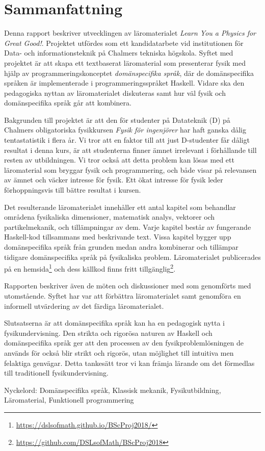 
\thispagestyle{plain}			%

\section*{Sammanfattning}

Denna rapport beskriver utvecklingen av läromaterialet \textit{Learn You a
Physics for Great Good!}. Projektet utfördes som ett kandidatarbete vid institutionen
för Data- och informationsteknik på Chalmers tekniska högskola. Syftet
med projektet är att skapa ett textbaserat läromaterial som presenterar fysik med hjälp av programmeringskonceptet
\textit{domänspecifika språk}, där de domänspecifika språken är
implementerade i programmeringsspråket Haskell. Vidare ska 
den pedagogiska nyttan av läromaterialet diskuteras samt hur väl fysik och
domänspecifika språk går att kombinera.

Bakgrunden till projektet är att den för studenter på Datateknik (D) på
Chalmers obligatoriska fysikkursen \textit{Fysik för ingenjörer} har
haft ganska dålig tentastatistik i flera år. Vi tror att en
faktor till att just D-studenter får dåligt resultat i denna
kurs, är att studenterna finner ämnet irrelevant i förhållande till
resten av utbildningen. Vi tror också att detta problem kan lösas med ett
läromaterial som bryggar fysik och
programmering, och både visar på relevansen av ämnet och väcker
intresse för fysik. Ett ökat intresse för fysik leder förhoppningsvis
till bättre resultat i kursen.

Det resulterande läromaterialet innehåller ett antal kapitel som
behandlar områdena fysikaliska dimensioner, matematisk analys,
vektorer och partikelmekanik, och tillämpningar av dem. Varje kapitel
består av fungerande Haskell-kod tillsammans med beskrivande
text. Vissa kapitel bygger upp domänspecifika språk från grunden medan
andra kombinerar och tillämpar tidigare domänspecifika språk på
fysikaliska problem. Läromaterialet publicerades på en hemsida\footnote{\url{https://dslsofmath.github.io/BScProj2018/}}
och dess källkod finns
fritt tillgänglig\footnote{\url{https://github.com/DSLsofMath/BScProj2018}}.

Rapporten beskriver
även de möten och diskussioner med som genomförts med utomstående. Syftet har var att
förbättra läromaterialet samt genomföra en informell utvärdering av det
färdiga läromaterialet.

Slutsatserna är att
domänspecifika språk kan ha en pedagogisk nytta i
fysikundervisning. Den strikta och
rigorösa naturen av Haskell och domänspecifika språk ger att den
processen av den fysikproblemlösningen de används för också blir
strikt och rigorös, utan möjlighet till intuitiva men felaktiga
genvägar. Detta tankesätt tror vi kan främja lärande om det förmedlas
till traditionell fysikundervisning.

\vfill
Nyckelord: Domänspecifika språk, Klassisk mekanik, Fysikutbildning, Läromaterial, Funktionell programmering

\newpage				%
\thispagestyle{empty}
\mbox{}
